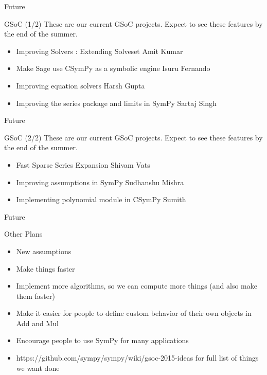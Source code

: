 \documentclass[xcolor=svgnames]{beamer}
\begin{document}
  \begin{frame}{Future}
    \begin{block}{GSoC (1/2)}
      These are our current GSoC projects. Expect to see these features by the end
      of the summer.
      \begin{itemize}
      \item \normalsize Improving Solvers : Extending Solveset \small Amit Kumar
      \item \normalsize Make Sage use CSymPy as a symbolic engine \small Isuru Fernando
      \item \normalsize Improving equation solvers \small Harsh Gupta
      \item \normalsize Improving the series package and limits in SymPy \small Sartaj Singh
      
      \end{itemize}
    \end{block}
  \end{frame}

  \begin{frame}{Future}
    \begin{block}{GSoC (2/2)}
      These are our current GSoC projects. Expect to see these features by the end
      of the summer.
      \begin{itemize}
      \item \normalsize Fast Sparse Series Expansion \small Shivam Vats
      \item \normalsize Improving assumptions in SymPy \small Sudhanshu Mishra
      \item \normalsize Implementing polynomial module in CSymPy \small Sumith

      \end{itemize}
    \end{block}
  \end{frame}

  \begin{frame}{Future}
  \begin{block}{Other Plans}
  \begin{itemize}
  \item New assumptions
  \item Make things faster
  \item Implement more algorithms, so we can compute more things (and also make
    them faster)
  \item Make it easier for people to define custom behavior of their own objects
    in Add and Mul
  \item Encourage people to use SymPy for many applications
  \item https://github.com/sympy/sympy/wiki/gsoc-2015-ideas for full list of
    things we want done
  \end{itemize}
  \end{block}
  \end{frame}
\end{document}
